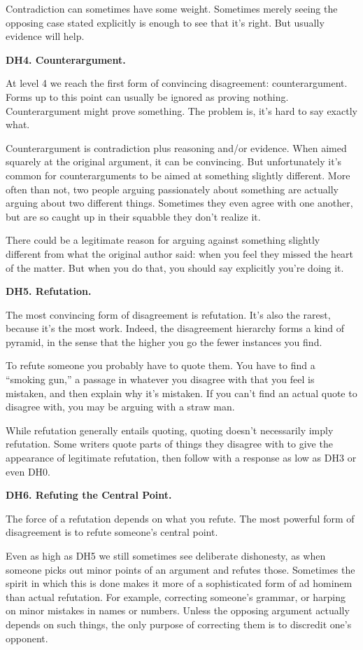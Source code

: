 Contradiction can sometimes have some weight. Sometimes merely seeing
the opposing case stated explicitly is enough to see that it's right.
But usually evidence will help.

\textbf{DH4. Counterargument.}

At level 4 we reach the first form of convincing disagreement:
counterargument. Forms up to this point can usually be ignored as
proving nothing. Counterargument might prove something. The problem is,
it's hard to say exactly what.

Counterargument is contradiction plus reasoning and/or evidence. When
aimed squarely at the original argument, it can be convincing. But
unfortunately it's common for counterarguments to be aimed at something
slightly different. More often than not, two people arguing passionately
about something are actually arguing about two different things.
Sometimes they even agree with one another, but are so caught up in
their squabble they don't realize it.

There could be a legitimate reason for arguing against something
slightly different from what the original author said: when you feel
they missed the heart of the matter. But when you do that, you should
say explicitly you're doing it.

\textbf{DH5. Refutation.}

The most convincing form of disagreement is refutation. It's also the
rarest, because it's the most work. Indeed, the disagreement hierarchy
forms a kind of pyramid, in the sense that the higher you go the fewer
instances you find.

To refute someone you probably have to quote them. You have to find a
``smoking gun,'' a passage in whatever you disagree with that you feel
is mistaken, and then explain why it's mistaken. If you can't find an
actual quote to disagree with, you may be arguing with a straw man.

While refutation generally entails quoting, quoting doesn't necessarily
imply refutation. Some writers quote parts of things they disagree with
to give the appearance of legitimate refutation, then follow with a
response as low as DH3 or even DH0.

\textbf{DH6. Refuting the Central Point.}

The force of a refutation depends on what you refute. The most powerful
form of disagreement is to refute someone's central point.

Even as high as DH5 we still sometimes see deliberate dishonesty, as
when someone picks out minor points of an argument and refutes those.
Sometimes the spirit in which this is done makes it more of a
sophisticated form of ad hominem than actual refutation. For example,
correcting someone's grammar, or harping on minor mistakes in names or
numbers. Unless the opposing argument actually depends on such things,
the only purpose of correcting them is to discredit one's opponent.

